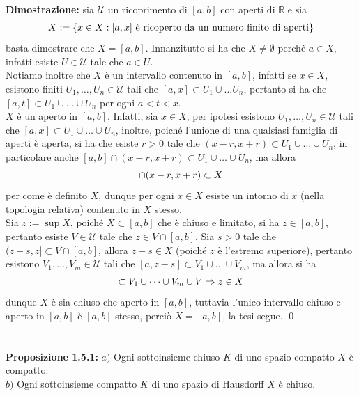\documentclass{article}
\begin{document}
\textbf{Dimostrazione:} sia $\mathcal{U}$ un ricoprimento di $[a, b]$ con aperti di $\mathbb{R}$ e sia
\begin{gather}
    X := \{ x \in X : [a, x] \text{ è ricoperto da un numero finito di aperti} \} \notag
\end{gather}
basta dimostrare che $X = [a, b]$. Innanzitutto si ha che $X \neq \emptyset$ perché $a \in X$, infatti esiste $U \in \mathcal{U}$ tale che $a \in U$. \\
Notiamo inoltre che $X$ è un intervallo contenuto in $[a, b]$, infatti se $x \in X$, esistono finiti $U_1, \dots, U_n \in \mathcal{U}$ tali che $[a, x] \subset U_1 \cup \dots U_n$, pertanto si ha che $[a, t] \subset U_1 \cup \dots \cup U_n$ per ogni $a < t < x$. \\
$X$ è un aperto in $[a, b]$. Infatti, sia $x \in X$, per ipotesi esistono $U_1, \dots, U_n \in \mathcal{U}$ tali che $[a, x] \subset U_1 \cup \dots \cup U_n$, inoltre, poiché l'unione di una qualsiasi famiglia di aperti è aperta, si ha che esiste $r > 0$ tale che $(x - r, x+ r) \subset U_1 \cup \dots \cup U_n$, in particolare anche $[a, b] \cap (x - r, x + r) \subset U_1 \cup \dots \cup U_n$, ma allora
\begin{gather}
    [a, b] \cap (x - r, x + r) \subset X \notag
\end{gather}
per come è definito $X$, dunque per ogni $x \in X$ esiste un intorno di $x$ (nella topologia relativa) contenuto in $X$ stesso. \\
Sia $z := \sup X$, poiché $X \subset [a, b]$ che è chiuso e limitato, si ha $z \in [a, b]$, pertanto esiste $V \in \mathcal{U}$ tale che $z \in V \cap [a, b]$. Sia $s > 0$ tale che $(z - s, z] \subset V \cap [a, b]$, allora $z - s \in X$ (poiché $z$ è l'estremo superiore), pertanto esistono $V_1, \dots, V_m \in \mathcal{U}$ tali che $[a, z - s] \subset V_1 \cup \dots \cup V_m$, ma allora si ha
\begin{gather}
    [a, z] \subset V_1 \cup \dots \cup V_m \cup V \Rightarrow z \in X \notag
\end{gather}
dunque $X$ è sia chiuso che aperto in $[a, b]$, tuttavia l'unico intervallo chiuso e aperto in $[a, b]$ è $[a, b]$ stesso, perciò $X = [a, b]$, la tesi segue. \qed \\ \\ \\
\textbf{Proposizione 1.5.1:} $a)$ Ogni sottoinsieme chiuso $K$ di uno spazio compatto $X$ è compatto. \\
$b)$ Ogni sottoinsieme compatto $K$ di uno spazio di Hausdorff $X$ è chiuso. \\
\end{document}
